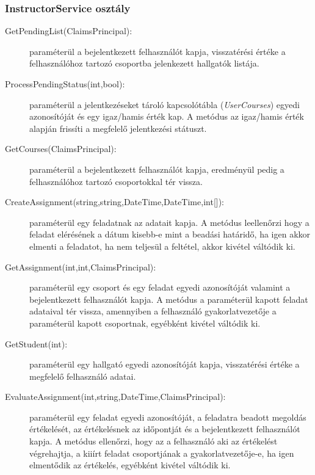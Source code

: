 \subsubsection{InstructorService osztály}
\begin{description}
	\item[GetPendingList(ClaimsPrincipal):] paraméterül a bejelentkezett felhasználót kapja, visszatérési értéke a felhasználóhoz tartozó csoportba jelenkezett hallgatók listája.
	\item[ProcessPendingStatus(int,bool):] paraméterül a jelentkezéseket tároló kapcsolótábla (\emph{UserCourses}) egyedi azonosítóját és egy igaz/hamis érték kap. A metódus az igaz/hamis érték alapján frissíti a megfelelő jelentkezési státuszt.
	\item[GetCourses(ClaimsPrincipal):] paraméterül a bejelentkezett felhasználót kapja, eredményül pedig a felhasználóhoz tartozó csoportokkal tér vissza.
	\item[CreateAssignment(string,string,DateTime,DateTime,int{[]}):] paraméterül egy feladatnak az adatait kapja. A metódus leellenőrzi hogy a feladat elérésének a dátum kisebb-e mint a beadási határidő, ha igen akkor elmenti a feladatot, ha nem teljesül a feltétel, akkor kivétel váltódik ki.
	\item[GetAssignment(int,int,ClaimsPrincipal):] paraméterül egy csoport és egy feladat egyedi azonosítóját valamint a bejelentkezett felhasználót kapja. A metódus a paraméterül kapott feladat adataival tér vissza, amennyiben a felhasználó gyakorlatvezetője a paraméterül kapott csoportnak, egyébként kivétel váltódik ki.
	\item[GetStudent(int):] paraméterül egy hallgató egyedi azonosítóját kapja, visszatérési értéke a megfelelő felhasználó adatai.
	\item[EvaluateAssignment(int,string,DateTime,ClaimsPrincipal):] paraméterül egy feladat egyedi azonosítóját, a feladatra beadott megoldás értékelését, az értékelésnek az időpontját és a bejelentkezett felhasználót kapja. A metódus ellenőrzi, hogy az a felhasználó aki az értékelést végrehajtja, a kiiírt feladat csoportjának a gyakorlatvezetője-e, ha igen elmentődik az értékelés, egyébként kivétel váltódik ki.
\end{description}
